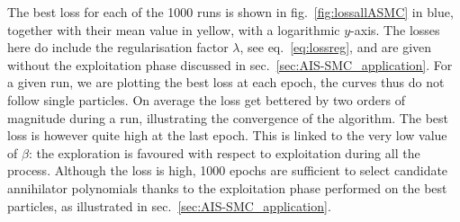 \documentclass[11pt,a4paper]{article}
\begin{document}
	The best loss for each of the 1000 runs is shown in fig.~\ref{fig:lossallASMC} in blue, together with their mean value in yellow, with a logarithmic $y$-axis. The losses here do include the regularisation factor $\lambda$, see eq.~\eqref{eq:lossreg}, and are given without the exploitation phase discussed in sec.~\ref{sec:AIS-SMC_application}. For a given run, we are plotting the best loss at each epoch, the curves thus do not follow single particles. On average the loss get bettered by two orders of magnitude during a run, illustrating the convergence of the algorithm. The best loss is however quite high at the last epoch. This is linked to the very low value of $\beta$: the exploration is favoured with respect to exploitation during all the process. Although the loss is high, 1000 epochs are sufficient to select candidate annihilator polynomials thanks to the exploitation phase performed on the best particles, as illustrated in sec.~\ref{sec:AIS-SMC_application}.


\end{document}
